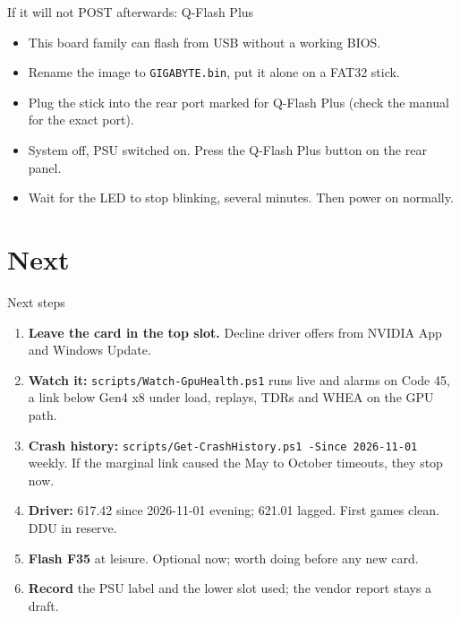 \documentclass[aspectratio=169,11pt]{beamer}
\begin{document}
\begin{frame}{If it will not POST afterwards: Q-Flash Plus}
  \begin{itemize}\setlength{\itemsep}{0.25em}
    \item This board family can flash from USB without a working BIOS.
    \item Rename the image to \texttt{GIGABYTE.bin}, put it alone on a FAT32 stick.
    \item Plug the stick into the rear port marked for Q-Flash Plus (check the manual for the exact port).
    \item System off, PSU switched on. Press the Q-Flash Plus button on the rear panel.
    \item Wait for the LED to stop blinking, several minutes. Then power on normally.
  \end{itemize}
\end{frame}

\section{Next}

\begin{frame}{Next steps}
  \begin{enumerate}\setlength{\itemsep}{0.15em}
    \item \textbf{Leave the card in the top slot.} Decline driver offers from NVIDIA App and Windows Update.
    \item \textbf{Watch it:} \texttt{scripts/Watch-GpuHealth.ps1} runs live and alarms on Code 45,
      a link below Gen4 x8 under load, replays, TDRs and WHEA on the GPU path.
    \item \textbf{Crash history:} \texttt{scripts/Get-CrashHistory.ps1 -Since 2026-11-01} weekly.
      If the marginal link caused the May to October timeouts, they stop now.
    \item \textbf{Driver:} 617.42 since 2026-11-01 evening; 621.01 lagged. First games clean. DDU in reserve.
    \item \textbf{Flash F35} at leisure. Optional now; worth doing before any new card.
    \item \textbf{Record} the PSU label and the lower slot used; the vendor report stays a draft.
  \end{enumerate}
\end{frame}
\end{document}
